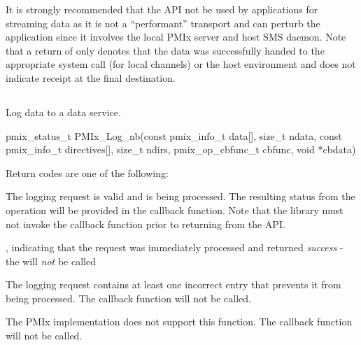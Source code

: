 \adviceuserstart
It is strongly recommended that the  API not be used by applications for streaming data as it is not a ``performant'' transport and can perturb the application since it involves the local \ac{PMIx} server and host \ac{SMS} daemon. Note that a return of  only denotes that the data was successfully handed to the appropriate system call (for local channels) or the host environment and does not indicate receipt at the final destination.
\adviceuserend

%
\subsection{}

\summary

Log data to a data service.

\format

\cspecificstart
\begin{codepar}
pmix_status_t
PMIx_Log_nb(const pmix_info_t data[], size_t ndata,
            const pmix_info_t directives[], size_t ndirs,
            pmix_op_cbfunc_t cbfunc, void *cbdata)
\end{codepar}
\cspecificend

\begin{arglist}
\end{arglist}

Return codes are one of the following:

\begin{constantdesc}
\item {} The logging request is valid and is being processed. The resulting status from the operation will be provided in the callback function. Note that the library must not invoke the callback function prior to returning from the \ac{API}.
\item {}, indicating that the request was immediately processed and returned \textit{success} - the  will \textit{not} be called
\item {} The logging request contains at least one incorrect entry that prevents it from being processed. The callback function will not be called.
\item {} The \ac{PMIx} implementation does not support this function. The callback function will not be called.
\end{constantdesc}

